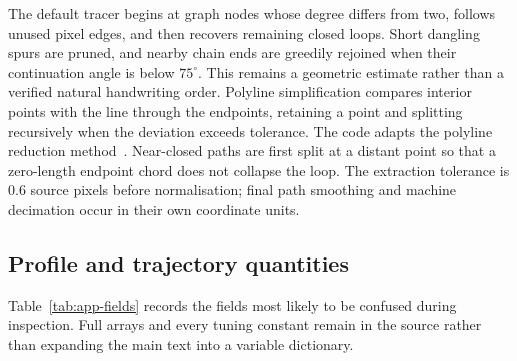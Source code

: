 The default tracer begins at graph nodes whose degree differs from two, follows unused pixel edges, and then recovers remaining closed loops. Short dangling spurs are pruned, and nearby chain ends are greedily rejoined when their continuation angle is below $75^\circ$. This remains a geometric estimate rather than a verified natural handwriting order. Polyline simplification compares interior points with the line through the endpoints, retaining a point and splitting recursively when the deviation exceeds tolerance. The code adapts the polyline reduction method~\cite[page to verify]{douglas1973}. Near-closed paths are first split at a distant point so that a zero-length endpoint chord does not collapse the loop. The extraction tolerance is 0.6 source pixels before normalisation; final path smoothing and machine decimation occur in their own coordinate units.

\subsection{Profile and trajectory quantities}
Table~\ref{tab:app-fields} records the fields most likely to be confused during inspection. Full arrays and every tuning constant remain in the source rather than expanding the main text into a variable dictionary.

